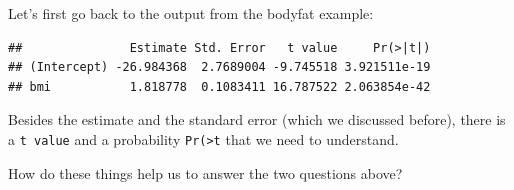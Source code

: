 \documentclass[10pt,ignorenonframetext,]{beamer}
\newenvironment{Shaded}{\begin{snugshade}}{\end{snugshade}}
\newcommand{\KeywordTok}[1]{\textcolor[rgb]{0.13,0.29,0.53}{\textbf{#1}}}
\newcommand{\OperatorTok}[1]{\textcolor[rgb]{0.81,0.36,0.00}{\textbf{#1}}}
\newcommand{\NormalTok}[1]{#1}
\begin{document}
\begin{frame}[fragile]

Let's first go back to the output from the bodyfat example:

\small

\begin{Shaded}
\end{Shaded}

\begin{verbatim}
##               Estimate Std. Error   t value     Pr(>|t|)
## (Intercept) -26.984368  2.7689004 -9.745518 3.921511e-19
## bmi           1.818778  0.1083411 16.787522 2.063854e-42
\end{verbatim}

\normalsize
Besides the estimate and the standard error (which we discussed before),
there is a \texttt{t\ value} and a probability
\texttt{Pr(\textgreater{}\textbar{}t\textbar{}} that we need to
understand.

How do these things help us to answer the two questions above?

\end{frame}
\end{document}
